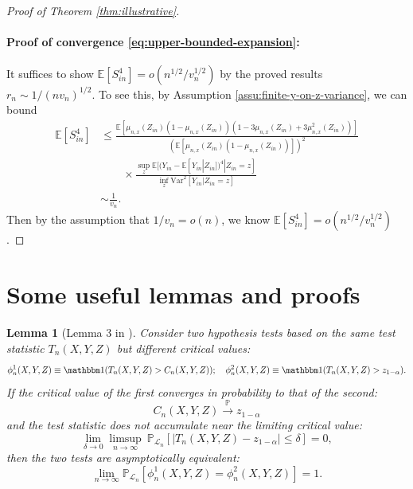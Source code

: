 \documentclass[12pt]{article}
\newtheorem{lemma}{Lemma}
\theoremstyle{definition}
\def\P{\mathbb{P}}
\def\P{\mathbb{P}}
\newcommand{\E}{\mathbb E}								%
\renewcommand{\P}{\mathbb{P}}							%
\newcommand{\indicator}{\mathbbm 1}						%
\newcommand{\convp}{\overset{\mathbb{P}}{\rightarrow}}             %
\newcommand{\srx}{X}									%
\newcommand{\srz}{Z}									%
\newcommand{\sry}{Y}									%
\newcommand{\law}{\mathcal L}							%
\begin{document}
\begin{proof}[Proof of Theorem \ref{thm:illustrative}]
  \paragraph{Proof of convergence \eqref{eq:upper-bounded-expansion}:}
  It suffices to show $\E[S_{in}^4]=o(n^{1/2}/v_n^{1/2})$ by the proved results $r_n\sim 1/(nv_n)^{1/2}$. To see this, by Assumption \ref{assu:finite-y-on-z-variance}, we can bound 
  \begin{align*}
	\E[S_{in}^4]
	&
	\leq \frac{\E[\mu_{n,x}(\srz_{in})(1-\mu_{n,x}(\srz_{in}))(1-3\mu_{n,x}(\srz_{in})+3\mu_{n,x}^2(\srz_{in}))]}{(\E[\mu_{n,x}(\srz_{in})(1-\mu_{n,x}(\srz_{in}))])^{2}}\\
	&
	\qquad
	\times \frac{\sup_z\E[(\sry_{in}-\E[\sry_{in}|\srz_{in}])^4|\srz_{in}=z]}{\inf_{z}\mathrm{Var}^2[\sry_{in}|\srz_{in}=z]}\\
	&
	\sim \frac{1}{v_n}.
  \end{align*}
  Then by the assumption that $1/v_n=o(n)$, we know $\E[S_{in}^4]=o(n^{1/2}/v_n^{1/2})$.
\end{proof}



\section{Some useful lemmas and proofs}\label{sec:useful_lemma}


\begin{lemma}[Lemma 3 in \cite{Niu2022a}]\label{lem:unified_asymptotic_equivalence}
	Consider two hypothesis tests based on the same test statistic $T_n(\srx, \sry, \srz)$ but different critical values:
	\begin{equation*}
		\phi_n^1(\srx, \sry, \srz) \equiv \indicator(T_n(\srx, \sry, \srz) > C_n(\srx, \sry, \srz)); \quad \phi_n^2(\srx, \sry, \srz) \equiv \indicator(T_n(\srx, \sry, \srz) > z_{1-\alpha}). 
	\end{equation*}
	If the critical value of the first converges in probability to that of the second:
	\begin{equation*}
		C_n(\srx, \sry, \srz) \convp z_{1-\alpha}
	\end{equation*}
	and the test statistic does not accumulate near the limiting critical value:
	\begin{equation}
		\lim_{\delta \rightarrow 0}\limsup_{n \rightarrow \infty}\ \P_{\law_n}[|T_n(\srx, \sry, \srz)-z_{1-\alpha}| \leq \delta] = 0,
		\label{eq:non-accumulation-app}
	\end{equation}
	then the two tests are asymptotically equivalent:
	\begin{equation*}
		\lim_{n \rightarrow \infty}\P_{\law_n}[\phi_n^{1}(\srx, \sry, \srz) = \phi_n^2(\srx, \sry, \srz)] = 1.
	\end{equation*}
\end{lemma}
\end{document}
